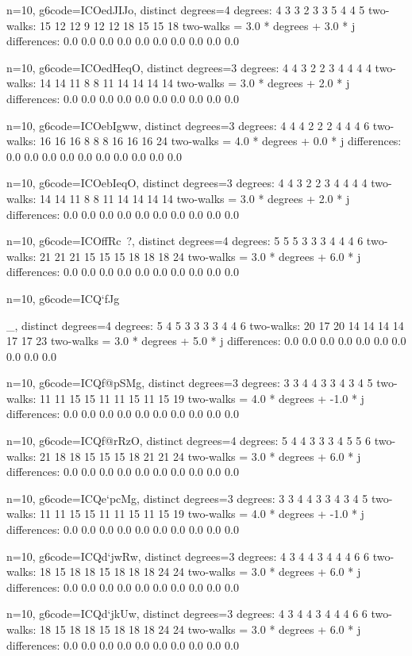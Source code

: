{{{{{{{{{{{{{{{{{n=10, g6code=ICOedJIJo, distinct degrees=4
degrees: 4 3 3 2 3 3 5 4 4 5 
two-walks: 15 12 12 9 12 12 18 15 15 18 
two-walks = 3.0 * degrees + 3.0 * j
differences: 0.0 0.0 0.0 0.0 0.0 0.0 0.0 0.0 0.0 0.0 

n=10, g6code=ICOedHeqO, distinct degrees=3
degrees: 4 4 3 2 2 3 4 4 4 4 
two-walks: 14 14 11 8 8 11 14 14 14 14 
two-walks = 3.0 * degrees + 2.0 * j
differences: 0.0 0.0 0.0 0.0 0.0 0.0 0.0 0.0 0.0 0.0 

n=10, g6code=ICOebIgww, distinct degrees=3
degrees: 4 4 4 2 2 2 4 4 4 6 
two-walks: 16 16 16 8 8 8 16 16 16 24 
two-walks = 4.0 * degrees + 0.0 * j
differences: 0.0 0.0 0.0 0.0 0.0 0.0 0.0 0.0 0.0 0.0 

n=10, g6code=ICOebIeqO, distinct degrees=3
degrees: 4 4 3 2 2 3 4 4 4 4 
two-walks: 14 14 11 8 8 11 14 14 14 14 
two-walks = 3.0 * degrees + 2.0 * j
differences: 0.0 0.0 0.0 0.0 0.0 0.0 0.0 0.0 0.0 0.0 

n=10, g6code=ICOffRc~?, distinct degrees=4
degrees: 5 5 5 3 3 3 4 4 4 6 
two-walks: 21 21 21 15 15 15 18 18 18 24 
two-walks = 3.0 * degrees + 6.0 * j
differences: 0.0 0.0 0.0 0.0 0.0 0.0 0.0 0.0 0.0 0.0 

n=10, g6code=ICQ`fJg}_, distinct degrees=4
degrees: 5 4 5 3 3 3 3 4 4 6 
two-walks: 20 17 20 14 14 14 14 17 17 23 
two-walks = 3.0 * degrees + 5.0 * j
differences: 0.0 0.0 0.0 0.0 0.0 0.0 0.0 0.0 0.0 0.0 

n=10, g6code=ICQf@pSMg, distinct degrees=3
degrees: 3 3 4 4 3 3 4 3 4 5 
two-walks: 11 11 15 15 11 11 15 11 15 19 
two-walks = 4.0 * degrees + -1.0 * j
differences: 0.0 0.0 0.0 0.0 0.0 0.0 0.0 0.0 0.0 0.0 

n=10, g6code=ICQf@rRzO, distinct degrees=4
degrees: 5 4 4 3 3 3 4 5 5 6 
two-walks: 21 18 18 15 15 15 18 21 21 24 
two-walks = 3.0 * degrees + 6.0 * j
differences: 0.0 0.0 0.0 0.0 0.0 0.0 0.0 0.0 0.0 0.0 

n=10, g6code=ICQe`pcMg, distinct degrees=3
degrees: 3 3 4 4 3 3 4 3 4 5 
two-walks: 11 11 15 15 11 11 15 11 15 19 
two-walks = 4.0 * degrees + -1.0 * j
differences: 0.0 0.0 0.0 0.0 0.0 0.0 0.0 0.0 0.0 0.0 

n=10, g6code=ICQd`jwRw, distinct degrees=3
degrees: 4 3 4 4 3 4 4 4 6 6 
two-walks: 18 15 18 18 15 18 18 18 24 24 
two-walks = 3.0 * degrees + 6.0 * j
differences: 0.0 0.0 0.0 0.0 0.0 0.0 0.0 0.0 0.0 0.0 

n=10, g6code=ICQd`jkUw, distinct degrees=3
degrees: 4 3 4 4 3 4 4 4 6 6 
two-walks: 18 15 18 18 15 18 18 18 24 24 
two-walks = 3.0 * degrees + 6.0 * j
differences: 0.0 0.0 0.0 0.0 0.0 0.0 0.0 0.0 0.0 0.0 

}}}}}}}}}}}}}}}}
